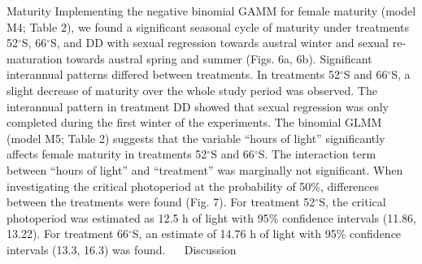 Maturity 
Implementing the negative binomial GAMM for female maturity (model M4; Table 2), we found a significant seasonal cycle of maturity under treatments 52$^{\circ}$S, 66$^{\circ}$S, and DD with sexual regression towards austral winter and sexual re-maturation towards austral spring and summer (Figs. 6a, 6b). Significant interannual patterns differed between treatments. In treatments 52$^{\circ}$S and 66$^{\circ}$S, a slight decrease of maturity over the whole study period was observed. The interannual pattern in treatment DD showed that sexual regression was only completed during the first winter of the experiments. 
The binomial GLMM (model M5; Table 2) suggests that the variable “hours of light” significantly affects female maturity in treatments 52$^{\circ}$S and 66$^{\circ}$S. The interaction term between “hours of light” and “treatment” was marginally not significant. When investigating the critical photoperiod at the probability of 50\%, differences between the treatments were found (Fig. 7). For treatment 52$^{\circ}$S, the critical photoperiod was estimated as 12.5 h of light with 95\% confidence intervals (11.86, 13.22). For treatment 66$^{\circ}$S, an estimate of 14.76 h of light with 95\% confidence intervals (13.3, 16.3) was found.
 
Discussion

